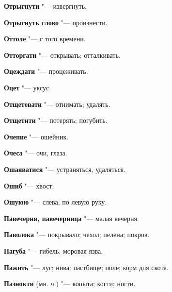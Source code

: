 \begin{mymulticols}{2}
\noindent\textbf{Отрыгнути} "--- извергнуть. 




\noindent\textbf{Отрыгнуть слово} "--- произнести. 




\noindent\textbf{Оттоле} "--- с того времени. 




\noindent\textbf{Отторгати} "--- открывать; отталкивать. 




\noindent\textbf{Оцеждати} "--- процеживать. 




\noindent\textbf{Оцет} "--- уксус. 




\noindent\textbf{Отщетевати} "--- отнимать; удалять. 




\noindent\textbf{Отщетити} "--- потерять; погубить. 




\noindent\textbf{Очепие} "--- ошейник. 




\noindent\textbf{Очеса} "--- очи, глаза. 




\noindent\textbf{Ошаяватися} "--- устраняться, удаляться. 




\noindent\textbf{Ошиб} "--- хвост. 




\noindent\textbf{Ошуюю} "--- слева; по левую руку. 




\bukvaending






\noindent\textbf{Павечерня, павечерница} "--- малая вечерня. 




\noindent\textbf{Паволока} "--- покрывало; чехол; пелена; покров. 




\noindent\textbf{Пагуба} "--- гибель; моровая язва. 




\noindent\textbf{Пажить} "--- луг; нива; пастбище; поле; корм для скота. 




\noindent\textbf{Пазнокти} (мн. ч.) "--- копыта; когти; ногти. 





\end{mymulticols}
